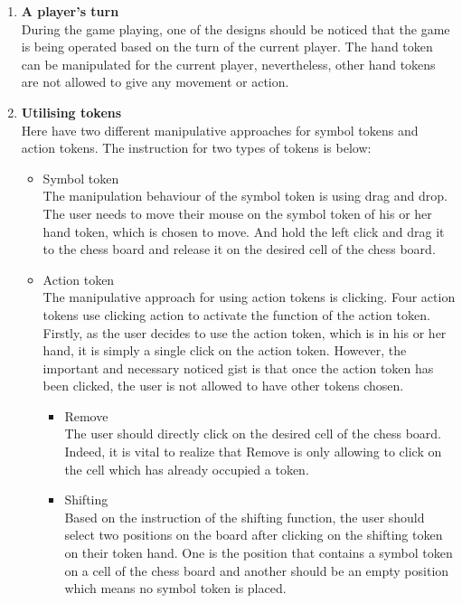 \begin{enumerate}
	\item\textbf{A player's turn}\\
    During the game playing, one of the designs should be noticed that the game is being operated based on the turn of the current player. The hand token can be manipulated for the current player, nevertheless, other hand tokens are not allowed to give any movement or action.
	
	\item\textbf{Utilising tokens}\\
	Here have two different manipulative approaches for symbol tokens and action tokens. The instruction for two types of tokens is below:
	\begin{itemize}
		\item{Symbol token} \\
	    The manipulation behaviour of the symbol token is using drag and drop. The user needs to move their mouse on the symbol token of his or her hand token, which is chosen to move. And hold the left click and drag it to the chess board and release it on the desired cell of the chess board.  
		
		\item{Action token} \\
		The manipulative approach for using action tokens is clicking. Four action tokens use clicking action to activate the function of the action token. Firstly, as the user decides to use the action token, which is in his or her hand, it is simply a single click on the action token. However, the important and necessary noticed gist is that once the action token has been clicked, the user is not allowed to have other tokens chosen.  
		
		\begin{itemize}
			\item{Remove} \\
			The user should directly click on the desired cell of the chess board. Indeed, it is vital to realize that Remove is only allowing to click on the cell which has already occupied a token.  
			
			\item{Shifting} \\
	    	Based on the instruction of the shifting function, the user should select two positions on the board after clicking on the shifting token on their token hand. One is the position that contains a symbol token on a cell of the chess board and another should be an empty position which means no symbol token is placed.  
			

\end{itemize}
\end{itemize}
\end{enumerate}

